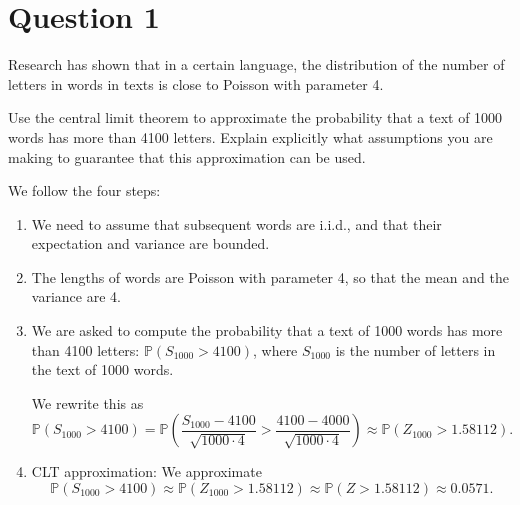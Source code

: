 \section{Question 1}

\begin{question}
    Research has shown that in a certain language, the distribution of the number of letters in words in texts is close to Poisson with parameter 4. 
    
    Use the central limit theorem to approximate the probability that a text of 1000 words has more than 4100 letters. Explain explicitly what assumptions you are making to guarantee that this approximation can be used.
\end{question}

\begin{answer}
    We follow the four steps:
    \begin{enumerate}
        \item We need to assume that subsequent words are i.i.d., and that their expectation and variance are bounded.
        
        \item The lengths of words are Poisson with parameter 4, so that the mean and the variance are 4.
        
        \item We are asked to compute the probability that a text of 1000 words has more than 4100 letters: $\mathbb{P}(S_{1000} > 4100)$, where $S_{1000}$ is the number of letters in the text of 1000 words. 
        
        We rewrite this as
        \begin{equation*}
            \mathbb{P}(S_{1000} > 4100) = \mathbb{P}\left( \frac{S_{1000} - 4100}{\sqrt{1000 \cdot 4}} > \frac{4100 - 4000}{\sqrt{1000 \cdot 4}} \right) \approx \mathbb{P}(Z_{1000} > 1.58112).
        \end{equation*}
        
        \item CLT approximation: We approximate
        \begin{equation*}
            \mathbb{P}(S_{1000} > 4100) \approx \mathbb{P}(Z_{1000} > 1.58112) \approx \mathbb{P}(Z > 1.58112) \approx 0.0571.
        \end{equation*}
    \end{enumerate}
\end{answer}